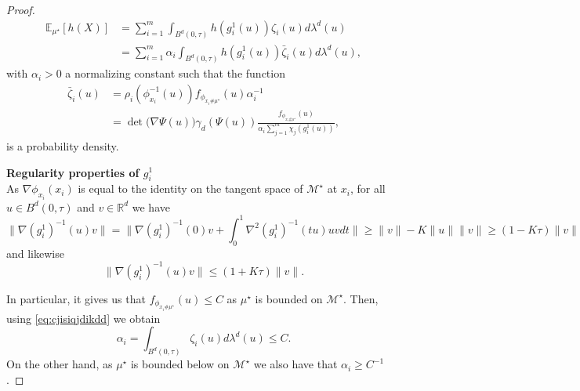 \documentclass[10pt]{article}
\begin{document}
\begin{proof}
\begin{align*}
 \mathbb{E}_{\mu^\star}[h(X)]  &=\sum \limits_{i=1}^m\int_{B^d(0,\tau)}h(g_i^1(u))\zeta_i(u)d\lambda^d(u)\\
 &=\sum \limits_{i=1}^m \alpha_i\int_{B^d(0,\tau)}h(g_i^1(u))\bar{\zeta}_i(u)d\lambda^d(u),
\end{align*}
with $\alpha_i>0$ a normalizing constant such that the function
\begin{align}\label{eq:fnkidjdojdjdnbsos}
\bar{\zeta}_i(u)&=\rho_i(\phi_{x_i}^{-1}(u))f_{\phi_{x_i\# \mu^\star}}(u)\alpha_i^{-1}\nonumber\\
&=\det\big(\nabla \Psi(u)\big)\gamma_d( \Psi(u))\frac{f_{\phi_{x_i\# \mu^\star}}(u)}{\alpha_i\sum_{j=1}^m\chi_j(g_i^1(u))},
\end{align}
is a probability density.

\textbf{Regularity properties of $g_i^1$}\\
As $\nabla \phi_{x_i}(x_i)$ is equal to the identity on the tangent space of $\mathcal{M}^\star$ at $x_i$, for all $u\in B^d(0,\tau)$ and $v\in \mathbb{R}^d$ we have 
$$\|\nabla (g_i^1)^{-1}(u)v\|=\|\nabla (g_i^1)^{-1}(0)v+\int_0^1 \nabla^2 (g_i^1)^{-1}(tu)uvdt\|\geq \|v\|-K\|u\| \|v\|\geq (1-K\tau)\|v\|$$
and likewise 
$$\|\nabla (g_i^1)^{-1}(u)v\|\leq (1+K\tau)\|v\|.$$

In particular, it gives us that $f_{\phi_{x_i\# \mu^\star}}(u)\leq C$ as $\mu^\star$ is bounded on $\mathcal{M}^\star$. Then, using \eqref{eq:cjisiqjdikdd} we obtain $$\alpha_i=\int_{B^d(0,\tau)} \zeta_i(u)d\lambda^d(u)
\leq C.$$ On the other hand, as $\mu^\star$ is bounded below on $\mathcal{M}^\star$ we also have that $\alpha_i\geq C^{-1}$.


\end{proof}
\end{document}
